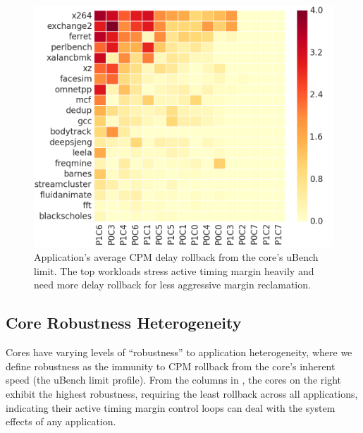 \begin{figure}[t]
  \centering
  \includegraphics[trim=0 0 0 0,clip,width=\linewidth]{graphs/process//spec-limit-dist/app-rollback.png}
  \caption{Application's average CPM delay rollback from the core's uBench limit. The top workloads stress active timing margin heavily and need more delay rollback for less aggressive margin reclamation.}
  \label{fig:app-cpm-heactive timing marginap}
\end{figure}

\subsection{Core Robustness Heterogeneity}
\label{sec:process:workload:robustness}


Cores have varying levels of ``robustness'' to application heterogeneity, where we define robustness as the immunity to CPM rollback from the core's inherent speed (the uBench limit profile). From the columns in , the cores on the right exhibit the highest robustness, requiring the least rollback across all applications, indicating their active timing margin control loops can deal with the system effects of any application.

